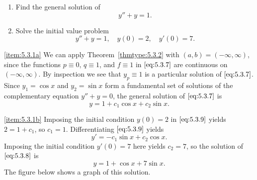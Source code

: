 \documentclass{ximera}
\begin{document}
\begin{example}\label{example:5.3.1}
\begin{enumerate}
\item \label{item:5.3.1a} %
Find the general solution of
\begin{equation} \label{eq:5.3.7}
y''+y=1.
\end{equation}
\item \label{item:5.3.1b} %
Solve the initial value problem
\begin{equation} \label{eq:5.3.8}
y''+y=1, \quad  y(0)=2,\quad y'(0)=7.
\end{equation}
\end{enumerate}
 
 
\begin{explanation} \ref{item:5.3.1a}
We can apply Theorem~\ref{thmtype:5.3.2} with $(a,b)= (-\infty,\infty)$,
since the functions $p\equiv0$, $q\equiv1$, and $f\equiv1$ in
$\eqref{eq:5.3.7}$ are continuous on $(-\infty,\infty)$. By inspection we
see that $y_p\equiv1$ is a particular solution of $\eqref{eq:5.3.7}$. Since
$y_1=\cos x$ and $y_2=\sin x$ form a fundamental set of solutions of
the complementary equation $y''+y=0$, the general solution of
$\eqref{eq:5.3.7}$ is
\begin{equation} \label{eq:5.3.9}
y=1+c_1\cos x+c_2\sin x.
\end{equation}
 
\ref{item:5.3.1b}
Imposing the initial condition $y(0)=2$ in $\eqref{eq:5.3.9}$ yields
$2=1+c_1$, so $c_1=1$. Differentiating $\eqref{eq:5.3.9}$ yields
$$
y'=-c_1\sin x+c_2\cos x.
$$
Imposing the initial condition $y'(0)=7$ here yields $c_2=7$,
so the solution of $\eqref{eq:5.3.8}$ is
$$
y=1+\cos x+7\sin x.
$$
The figure below shows a graph of this solution.
 
\begin{center}
\end{center}

 
\end{explanation}
\end{example}
 
\end{document}
